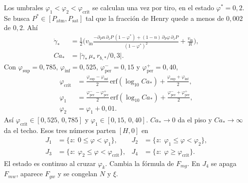 \documentclass[11pt,a4paper]{article}
\newcommand{\vin}{v_{\mathrm{in}}}
\begin{document}
Los umbrales $\varphi_1<\varphi_2<\varphi_{\mathrm{crit}}$ se
calculan una vez por tiro, en el estado $\varphi^\ast=0{,}2$. Se
busca $P^\ast\in[P_{\mathrm{atm}},P_{\mathrm{sat}}]$ tal que la
fracción de Henry quede a menos de $0{,}002$ de $0{,}2$. Ahí
\begin{equation}
\label{eq:Ca-ast}
\begin{aligned}
\dot\gamma_\ast
&=\frac12\Biggl(
\vin
\frac{
-\partial_P n\,\partial_z P\,(1-\varphi^\ast)
+(1-n)\,\partial_P\varphi\,\partial_z P
}{(1-\varphi^\ast)^2}
+\frac{\vin}{R}
\Biggr),
\\
Ca_\ast
&=\bigl\lvert\dot\gamma_\ast\,\mu_\ast\,r_{b,\ast}/0{,}3\bigr\rvert.
\end{aligned}
\end{equation}
Con $\varphi_{\mathrm{sup}}=0{,}785$,
$\varphi_{\mathrm{inf}}=0{,}525$,
$\varphi_{\mathrm{per}}^-=0{,}15$ y
$\varphi_{\mathrm{per}}^+=0{,}40$,
\begin{equation}
\label{eq:umbrales-Ca}
\begin{aligned}
\varphi_{\mathrm{crit}}
&=\frac{\varphi_{\mathrm{sup}}-\varphi_{\mathrm{inf}}}{2}\,
\mathrm{erf}(\log_{10}Ca_\ast)
+\frac{\varphi_{\mathrm{sup}}+\varphi_{\mathrm{inf}}}{2},
\\
\varphi_1
&=\frac{\varphi_{\mathrm{per}}^--\varphi_{\mathrm{per}}^+}{2}\,
\mathrm{erf}(\log_{10}Ca_\ast)
+\frac{\varphi_{\mathrm{per}}^-+\varphi_{\mathrm{per}}^+}{2},
\\
\varphi_2
&=\varphi_1+0{,}01.
\end{aligned}
\end{equation}
Así $\varphi_{\mathrm{crit}}\in[0{,}525,\,0{,}785]$ y
$\varphi_1\in[0{,}15,\,0{,}40]$. $Ca_\ast\to 0$ da el piso y
$Ca_\ast\to\infty$ da el techo. Esos tres números parten
$[H,0]$ en
\begin{equation}
\label{eq:tramos}
\begin{aligned}
J_1&=\{z:\;0\le\varphi<\varphi_1\},&
J_2&=\{z:\;\varphi_1\le\varphi<\varphi_2\},\\
J_3&=\{z:\;\varphi_2\le\varphi<\varphi_{\mathrm{crit}}\},&
J_4&=\{z:\;\varphi\ge\varphi_{\mathrm{crit}}\}.
\end{aligned}
\end{equation}
El estado es continuo al cruzar $\varphi_k$. Cambia la fórmula de
$F_{mg}$. En $J_4$ se apaga $F_{mw}$, aparece $F_{gw}$ y se congelan
$N$ y $\xi$.
\end{document}

